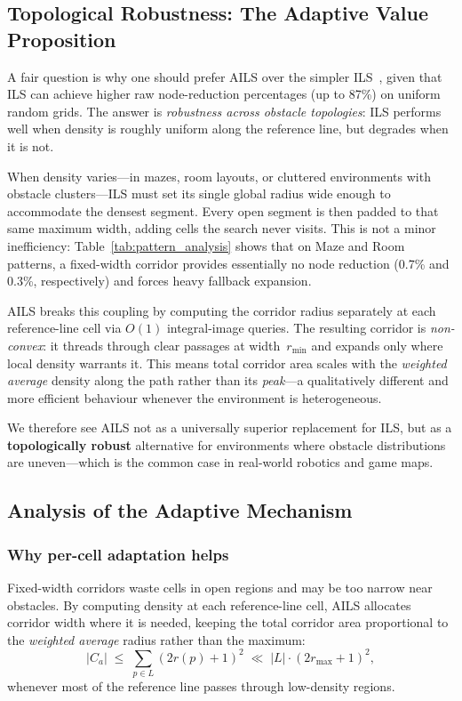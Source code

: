 \documentclass[journal]{IEEEtran}
\begin{document}
\subsection{Topological Robustness: The Adaptive Value Proposition}
\label{sec:robustness}

A fair question is why one should prefer AILS over the simpler ILS~\cite{elshahed2025ils}, given that ILS can achieve higher raw node-reduction percentages (up to 87\%) on uniform random grids.
The answer is \emph{robustness across obstacle topologies}: ILS performs well when density is roughly uniform along the reference line, but degrades when it is not.

When density varies---in mazes, room layouts, or cluttered environments with obstacle clusters---ILS must set its single global radius wide enough to accommodate the densest segment.
Every open segment is then padded to that same maximum width, adding cells the search never visits.
This is not a minor inefficiency: Table~\ref{tab:pattern_analysis} shows that on Maze and Room patterns, a fixed-width corridor provides essentially no node reduction (0.7\% and 0.3\%, respectively) and forces heavy fallback expansion.

AILS breaks this coupling by computing the corridor radius separately at each reference-line cell via $O(1)$ integral-image queries.
The resulting corridor is \emph{non-convex}: it threads through clear passages at width~$r_{\min}$ and expands only where local density warrants it.
This means total corridor area scales with the \emph{weighted average} density along the path rather than its \emph{peak}---a qualitatively different and more efficient behaviour whenever the environment is heterogeneous.

We therefore see AILS not as a universally superior replacement for ILS, but as a \textbf{topologically robust} alternative for environments where obstacle distributions are uneven---which is the common case in real-world robotics and game maps.

\subsection{Analysis of the Adaptive Mechanism}

\subsubsection{Why per-cell adaptation helps}
Fixed-width corridors waste cells in open regions and may be too narrow near obstacles.
By computing density at each reference-line cell, AILS allocates corridor width where it is needed, keeping the total corridor area proportional to the \emph{weighted average} radius rather than the maximum:
\begin{equation}
    |C_a| \;\leq\; \sum_{p \in L} (2r(p)+1)^{2}
    \;\ll\; |L| \cdot (2r_{\max}+1)^{2},
\end{equation}
whenever most of the reference line passes through low-density regions.
\end{document}
